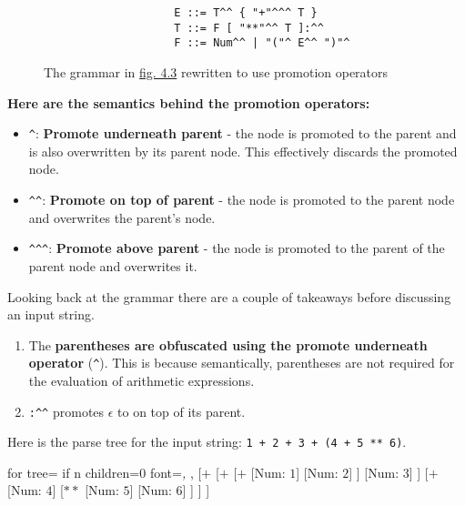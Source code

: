 \begin{figure}[H]
    \begin{center}
        \begin{verbatim}
                    E ::= T^^ { "+"^^^ T }
                    T ::= F [ "**"^^ T ]:^^
                    F ::= Num^^ | "("^ E^^ ")"^
        \end{verbatim}
    \end{center}
    \vspace{-1.5em}
    \caption{\label{fig:4.4}The grammar in \hyperref[fig:4.3]{fig. 4.3} rewritten to use promotion operators}
\end{figure}

\begin{center}
    \textbf{Here are the semantics behind the promotion operators:}
    \begin{itemize}
        \item \verb|^|: \textbf{Promote underneath parent} - the node is promoted to the parent and is also overwritten by its parent node. This effectively discards the promoted node.
        \item \verb|^^|: \textbf{Promote on top of parent} - the node is promoted to the parent node and overwrites the parent's node.
        \item \verb|^^^|: \textbf{Promote above parent} - the node is promoted to the parent of the parent node and overwrites it.
    \end{itemize}
\end{center}

Looking back at the grammar there are a couple of takeaways before discussing an input string.

\begin{enumerate}
    \item The \textbf{parentheses are obfuscated using the promote underneath operator} (\verb|^|). This is because semantically, parentheses are not required for the evaluation of arithmetic expressions.
    \item \verb|:^^| promotes $\epsilon$ to on top of its parent.
\end{enumerate}


\begin{center}
    Here is the parse tree for the input string: \verb|1 + 2 + 3 + (4 + 5 ** 6)|.
    \begin{forest}
        for tree={
            if n children=0{
                font=\itshape,
            }{},
            }
            [$+$
                [$+$
                    [$+$
                        [Num: $1$]
                        [Num: $2$]
                    ]
                    [Num: $3$]
                ]
                [$+$
                    [Num: $4$]
                    [$**$
                        [Num: $5$]
                        [Num: $6$]
                    ]
                ]
            ]
    \end{forest}
\end{center}

